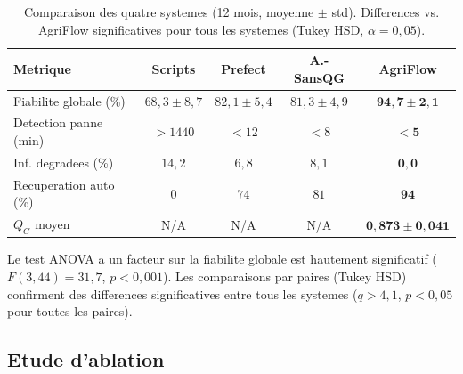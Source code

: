 \documentclass[12pt,a4paper]{article}
\theoremstyle{plain}
\theoremstyle{definition}
\theoremstyle{remark}
\begin{document}
\begin{table}[H]
\caption{Comparaison des quatre systemes (12 mois, moyenne $\pm$ std).
         Differences vs. AgriFlow significatives pour tous les systemes
         (Tukey HSD, $\alpha=0{,}05$).}
\label{tab:multisystem}
\centering\small
\renewcommand{\arraystretch}{1.38}
\begin{tabularx}{\linewidth}{Xcccc}
\toprule
\textbf{Metrique} & \textbf{Scripts} & \textbf{Prefect} &
\textbf{A.-SansQG} & \textbf{AgriFlow} \\
\midrule
\rowcolor{lightblue!30}
Fiabilite globale (\%)   & $68{,}3\pm8{,}7$ & $82{,}1\pm5{,}4$ & $81{,}3\pm4{,}9$ & $\mathbf{94{,}7\pm2{,}1}$ \\
Detection panne (min)    & $>1440$           & $<12$            & $<8$             & $\mathbf{<5}$ \\
\rowcolor{lightblue!30}
Inf. degradees (\%)      & $14{,}2$          & $6{,}8$          & $8{,}1$          & $\mathbf{0{,}0}$ \\
Recuperation auto (\%)   & $0$               & $74$             & $81$             & $\mathbf{94}$ \\
\rowcolor{lightblue!30}
$Q_G$ moyen              & N/A               & N/A              & N/A              & $\mathbf{0{,}873\pm0{,}041}$ \\
\bottomrule
\end{tabularx}
\end{table}

Le test ANOVA a un facteur sur la fiabilite globale est hautement
significatif ($F(3,44)=31{,}7$, $p<0{,}001$). Les comparaisons par paires
(Tukey HSD) confirment des differences significatives entre tous les
systemes ($q > 4{,}1$, $p < 0{,}05$ pour toutes les paires).

\subsection{Etude d'ablation}
\label{subsec:ablation}
\end{document}
